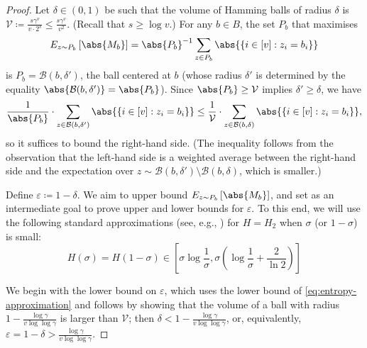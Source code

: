 \documentclass[10pt,a4paper]{article}
\theoremstyle{definition}
\renewcommand{\set}[1]{\left\{#1\right\}}
\newcommand{\eps}{\varepsilon}
\newcommand{\vcommitlength}{v}
\newcommand{\vcommitstring}{z}
\newcommand{\ball}{\mathcal B}
\newcommand{\alphabetsize}{\gamma}
\begin{document}
\begin{proof}
    Let $\delta \in (0,1)$ be such that the volume of Hamming balls of radius $\delta$ is $\mathcal{V} \coloneqq \frac{s \alphabetsize^\vcommitlength}{\vcommitlength \cdot 2^s} \leq \frac{s \alphabetsize^\vcommitlength}{\vcommitlength^2}$. (Recall that $s \geq \log \vcommitlength$.) For any $b \in B$, the set $P_b$ that maximises
    \begin{equation*}
        E_{\vcommitstring \sim P_b}\left[\abs{M_b}\right] = \abs{P_b}^{-1} \sum_{\vcommitstring \in P_b} \abs{\set{i \in [\vcommitlength] : \vcommitstring_i = b_i}}
    \end{equation*}
    is $P_b = \ball(b, \delta')$, the ball centered at $b$ (whose radius $\delta'$ is determined by the equality $\abs{\ball(b, \delta')} = \abs{P_b}$). Since $\abs{P_b} \geq \mathcal{V}$ implies $\delta' \geq \delta$, we have
    \begin{equation*}
        \frac1{\abs{P_b}} \cdot \sum_{\vcommitstring \in \ball(b, \delta')} \abs{\set{i \in [\vcommitlength] : \vcommitstring_i = b_i}} \leq \frac1{\mathcal{V}} \cdot \sum_{\vcommitstring \in \ball(b, \delta)} \abs{\set{i \in [\vcommitlength] : \vcommitstring_i = b_i}},
    \end{equation*}
    so it suffices to bound the right-hand side. (The inequality follows from the observation that the left-hand side is a weighted average between the right-hand side and the expectation over $\vcommitstring \sim \ball(b, \delta') \setminus \ball(b, \delta)$, which is smaller.)
    
    Define $\eps \coloneqq 1 - \delta$. We aim to upper bound $E_{\vcommitstring \sim P_b}\left[\abs{M_b}\right]$, and set as an intermediate goal to prove upper and lower bounds for $\eps$. To this end, we will use the following standard approximations (see, e.g., \cite{GRS12}) for $H = H_2$ when $\sigma$ (or $1 - \sigma$) is small:
    \begin{equation}
        \label{eq:entropy-approximation}
        H(\sigma) = H(1 - \sigma) \in \left[\sigma \log \frac1{\sigma}, \sigma \left(\log \frac1{\sigma} + \frac{2}{\ln 2}\right)\right]
    \end{equation}

    We begin with the lower bound on $\eps$, which uses the lower bound of \cref{eq:entropy-approximation}  and follows by showing that the volume of a ball with radius $1 - \frac{\log \alphabetsize}{\vcommitlength \log\log \alphabetsize}$ is larger than $\mathcal{V}$; then $\delta < 1 - \frac{\log \alphabetsize}{\vcommitlength \log\log \alphabetsize}$, or, equivalently, $\eps = 1 - \delta > \frac{\log \alphabetsize}{\vcommitlength \log\log \alphabetsize}$.
    

\end{proof}
\end{document}

